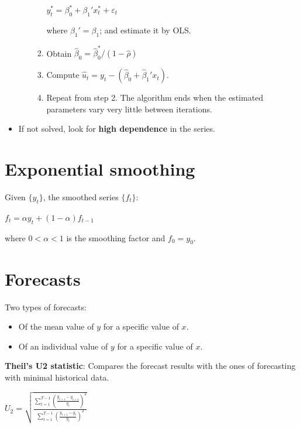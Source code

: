 \documentclass[10pt, a4paper, landscape]{article}
\begin{document}
\begin{multicols}{3}
\begin{itemize}[leftmargin=*]
\begin{itemize}[leftmargin=*]
\begin{enumerate}[leftmargin=*]
\begin{center}
				\( y_{t}^{*} = \beta_{0}^{*} + \beta_{1}' x_{t}^{*} + \varepsilon_{t} \)
			\end{center}
			where \( \beta_{1}' = \beta_{1} \); and estimate it by OLS.
			\item Obtain \( \hat{\beta}_0 = \hat{\beta}_{0}^{*} / (1 - \hat{\rho}) \)
			\item Compute \( \hat{u}_{t} = y_{t} - (\hat{\beta}_{0} + \hat{\beta}_{1}' x_{t}) \).
			\item Repeat from step 2. The algorithm ends when the estimated parameters vary very little between iterations.
		\end{enumerate}
	\end{itemize}
	\item If not solved, look for \textbf{high dependence} in the series.
\end{itemize}

\section*{Exponential smoothing}

Given \( \{ y_{t} \} \), the smoothed series \( \{ f_{t} \} \):

\begin{center}
	\( f_{t} = \alpha y_{t} + (1 - \alpha) f_{t - 1} \)
\end{center}

where \( 0 < \alpha < 1 \) is the smoothing factor and \( f_{0} = y_{0} \).

\section*{Forecasts}

Two types of forecasts:

\begin{itemize}[leftmargin=*]
	\item Of the mean value of \( y \) for a specific value of \( x \).
	\item Of an individual value of \( y \) for a specific value of \( x \).
\end{itemize}

\textbf{Theil's U2 statistic}: Compares the forecast results with the ones of forecasting with minimal historical data.

\begin{center}
	\( U_{2} = \sqrt{\frac{\sum_{t = 1}^{T - 1} \left( \frac{\hat{y}_{t + 1} - y_{t + 1}}{y_{t}} \right)^{2}}{\sum_{t = 1}^{T - 1} \left( \frac{y_{t + 1} - y_{t}}{y_{t}} \right)^{2}}} \)
\end{center}


\end{multicols}
\end{document}
